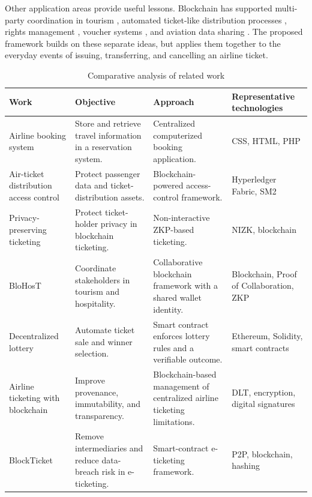 \documentclass[conference]{IEEEtran}
\begin{document}
Other application areas provide useful lessons. Blockchain has supported multi-party coordination in tourism \cite{bodkhe2019}, automated ticket-like distribution processes \cite{hire2023}, rights management \cite{guadamuz2021}, voucher systems \cite{hsu2020}, and aviation data sharing \cite{clementi2019}. The proposed framework builds on these separate ideas, but applies them together to the everyday events of issuing, transferring, and cancelling an airline ticket.

\begin{table}[!t]
\caption{Comparative analysis of related work}
\label{tab:related}
\centering
\footnotesize
\begin{tabularx}{\textwidth}{p{}Yp{.24\textwidth}p{.22\textwidth}}
\toprule
\textbf{Work} & \textbf{Objective} & \textbf{Approach} & \textbf{Representative technologies}\\
\midrule
Airline booking system \cite{shaikh2023} & Store and retrieve travel information in a reservation system. & Centralized computerized booking application. & CSS, HTML, PHP\\
Air-ticket distribution access control \cite{zhang2022} & Protect passenger data and ticket-distribution assets. & Blockchain-powered access-control framework. & Hyperledger Fabric, SM2\\
Privacy-preserving ticketing \cite{cha2018} & Protect ticket-holder privacy in blockchain ticketing. & Non-interactive ZKP-based ticketing. & NIZK, blockchain\\
BloHosT \cite{bodkhe2019} & Coordinate stakeholders in tourism and hospitality. & Collaborative blockchain framework with a shared wallet identity. & Blockchain, Proof of Collaboration, ZKP\\
Decentralized lottery \cite{hire2023} & Automate ticket sale and winner selection. & Smart contract enforces lottery rules and a verifiable outcome. & Ethereum, Solidity, smart contracts\\
Airline ticketing with blockchain \cite{sahoo2023} & Improve provenance, immutability, and transparency. & Blockchain-based management of centralized airline ticketing limitations. & DLT, encryption, digital signatures\\
BlockTicket \cite{aldweesh2023} & Remove intermediaries and reduce data-breach risk in e-ticketing. & Smart-contract e-ticketing framework. & P2P, blockchain, hashing\\
\bottomrule
\end{tabularx}
\end{table}
\end{document}

